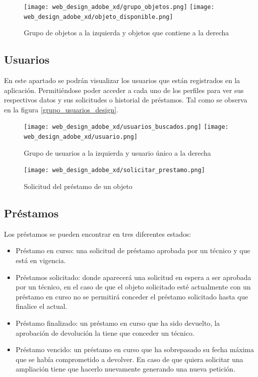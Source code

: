 \begin{figure}[ht]
    \centering
    \texttt{[image: web\_design\_adobe\_xd/grupo\_objetos.png]}
    \texttt{[image: web\_design\_adobe\_xd/objeto\_disponible.png]}
    \caption{Grupo de objetos a la izquierda y objetos que contiene a la derecha}\label{grupo_objetos_y_objetos_design}
\end{figure}

\subsection{Usuarios}

En este apartado se podrán visualizar los usuarios que están registrados en la aplicación. Permitiéndose poder acceder a cada uno de los perfiles para ver sus respectivos datos y sus solicitudes o historial de préstamos. Tal como se observa en la figura \ref{grupo_usuarios_design}.


\begin{figure}[ht]
    \begin{minipage}{0.55\textwidth}
        \begin{center}
            \texttt{[image: web\_design\_adobe\_xd/usuarios\_buscados.png]}
            \texttt{[image: web\_design\_adobe\_xd/usuario.png]}
            \caption{Grupo de usuarios a la izquierda y usuario único a la derecha}\label{grupo_usuarios_design}
        \end{center}
    \end{minipage}\hfill
    \begin{minipage}{0.35\textwidth}
        \centering
        \texttt{[image: web\_design\_adobe\_xd/solicitar\_prestamo.png]}
        \caption{Solicitud del préstamo de un objeto}\label{solicitar_prestamos_design}
    \end{minipage}
\end{figure}
\subsection{Préstamos}

Los préstamos se pueden encontrar en tres diferentes estados:

\begin{itemize}
    \item Préstamo en curso: una solicitud de préstamo aprobada por un técnico y que está en vigencia.
    \item Préstamos solicitado: donde aparecerá una solicitud en espera a ser aprobada por un técnico, en el caso de que el objeto solicitado esté actualmente con un préstamo en curso no se permitirá conceder el préstamo solicitado hasta que finalice el actual.
    \item Préstamo finalizado: un préstamo en curso que ha sido devuelto, la aprobación de devolución la tiene que conceder un técnico.
    \item Préstamo vencido: un préstamo en curso que ha sobrepasado su fecha máxima que se había comprometido a devolver. En caso de que quiera solicitar una ampliación tiene que hacerlo nuevamente generando una nueva petición.
\end{itemize}

